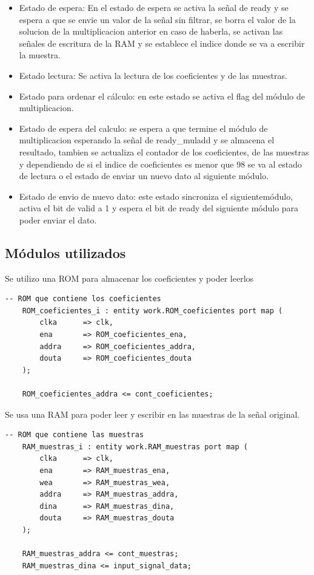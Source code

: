 \begin{itemize}
    \item Estado de espera: En el estado de espera se activa la señal de ready y se espera a que se envie un valor de la
    señal sin filtrar, se borra el valor de la solucion de la multiplicacion anterior en caso de haberla, se activan las
    señales de escritura de la RAM y se establece el indice donde se va a escribir la muestra.
    \item Estado lectura: Se activa la lectura de los coeficientes y de las muestras.
    \item Estado para ordenar el cálculo: en este estado se activa el flag del módulo de multiplicacion.
    \item Estado de espera del calculo: se espera a que termine el módulo de multiplicacion esperando la señal de ready\_muladd
    y se almacena el resultado, tambien se actualiza el contador de los coeficientes, de las muestras y dependiendo de si el 
    indice de coeficientes es menor que 98 se va al estado de lectura o el estado de enviar un nuevo dato al siguiente módulo.
    \item Estado de envio de nuevo dato: este estado sincroniza el siguientemódulo, activa el bit de valid a 1 y espera el bit
    de ready del siguiente módulo para poder enviar el dato.
\end{itemize}

\subsection{Módulos utilizados}
Se utilizo una ROM para almacenar los coeficientes y poder leerlos

\lstset{language=VHDL, breaklines=true, basicstyle=\footnotesize}
\begin{lstlisting}[frame=single]
    -- ROM que contiene los coeficientes 
    ROM_coeficientes_i : entity work.ROM_coeficientes port map (
        clka      => clk,
        ena       => ROM_coeficientes_ena,
        addra     => ROM_coeficientes_addra,
        douta     => ROM_coeficientes_douta
    );
    
    ROM_coeficientes_addra <= cont_coeficientes;
\end{lstlisting}

Se usa una RAM para poder leer y escribir en las muestras de la señal original.

\lstset{language=VHDL, breaklines=true, basicstyle=\footnotesize}
\begin{lstlisting}[frame=single]
    -- ROM que contiene las muestras 
    RAM_muestras_i : entity work.RAM_muestras port map (
        clka      => clk,
        ena       => RAM_muestras_ena,
        wea       => RAM_muestras_wea,
        addra     => RAM_muestras_addra,
        dina      => RAM_muestras_dina,
        douta     => RAM_muestras_douta
    );    
    
    RAM_muestras_addra <= cont_muestras;
    RAM_muestras_dina <= input_signal_data;
\end{lstlisting}

